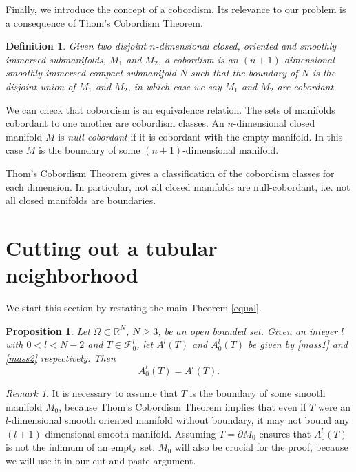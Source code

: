 \documentclass{amsart}
\numberwithin{equation}{section}
\theoremstyle{definition}
\newtheorem{definition}[theorem]{Definition}
\newtheorem{proposition}[theorem]{Proposition}
\theoremstyle{remark}
\newtheorem{remark}[theorem]{Remark}
\begin{document}
Finally, we introduce the concept of a cobordism. Its relevance to our problem is a consequence of Thom's Cobordism Theorem.

\begin{definition} \textit{Given two disjoint $n$-dimensional closed, oriented and smoothly immersed submanifolds, $M_1$ and $M_2$, a 
{cobordism} is an $(n+1)$-dimensional smoothly immersed compact submanifold $N$ such that the boundary of $N$ is the disjoint union of $M_1$ and $M_2$, in which case we say $M_1$ and $M_2$ are {cobordant}.}
\end{definition}

We can check that cobordism is an equivalence relation. The sets of manifolds cobordant to one another are cobordism classes. An $n$-dimensional closed manifold $M$ is \textit{null-cobordant} if it is cobordant with the empty manifold. In this case $M$ is the boundary of some 
$(n+1)$-dimensional manifold.

Thom's Cobordism Theorem \cite{Thom} gives a classification of the cobordism classes for each dimension. In particular, not all closed manifolds are null-cobordant, i.e. not all closed manifolds are boundaries.


\section{Cutting out a tubular neighborhood}

We start this section by restating the main Theorem \ref{equal}.

\begin{proposition} \textit{Let $\Omega \subset \mathbb{R}^N$, $N\geq 3$, be an open bounded set. 
Given an integer $l$ with $0 < l < N-2$ and $T\in \mathcal{F}_0^l$, let $A^l(T)$ and $A_0^l(T)$ be given by
\eqref{mass1} and \eqref{mass2} respectively. Then
\[ A_0^l(T) = A^l(T) .\]}
\end{proposition}

\begin{remark}  It is necessary to assume that $T$ is the boundary of some smooth manifold $M_0$, because Thom's Cobordism Theorem \cite{Thom} implies that even if $T$ were an $l$-dimensional smooth oriented manifold without boundary, it may not bound any $(l+1)$-dimensional smooth manifold. Assuming $T= \partial M_0$ ensures that $A_0^l(T)$ is not the infimum of an empty set. $M_0$ will also be crucial for the proof, because we will use it in our cut-and-paste argument.
\end{remark}
\end{document}
